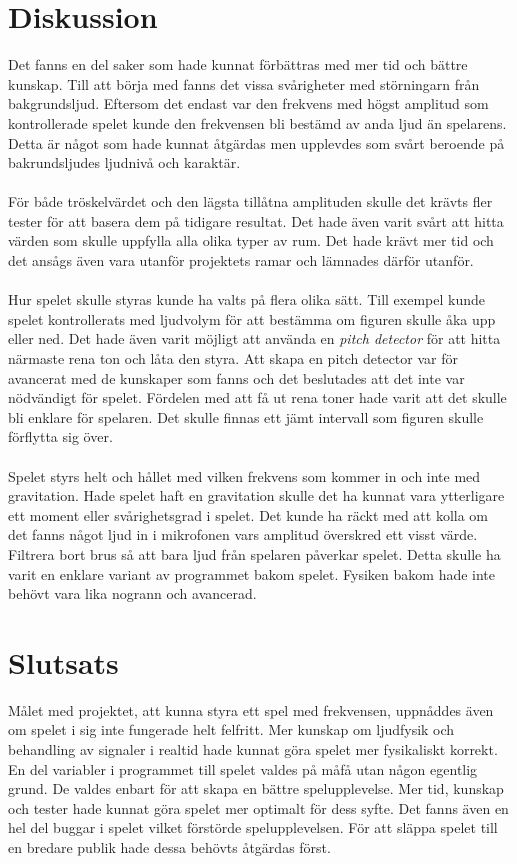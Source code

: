 \documentclass[12pt, titlepage, a4paper]{article}
\begin{document}
	\section{Diskussion}
		Det fanns en del saker som hade kunnat förbättras med mer tid och bättre kunskap. Till att börja med fanns det vissa svårigheter med störningarn från bakgrundsljud. Eftersom det endast var den frekvens med högst amplitud som kontrollerade spelet kunde den frekvensen bli bestämd av anda ljud än spelarens. Detta är något som hade kunnat åtgärdas men upplevdes som svårt beroende på bakrundsljudes ljudnivå och karaktär.
		\\ \\
		För både tröskelvärdet och den lägsta tillåtna amplituden skulle det krävts fler tester för att basera dem på tidigare resultat. Det hade även varit svårt att hitta värden som skulle uppfylla alla olika typer av rum. Det hade krävt mer tid och det ansågs även vara utanför projektets ramar och lämnades därför utanför.
		\\ \\
		Hur spelet skulle styras kunde ha valts på flera olika sätt. Till exempel kunde spelet kontrollerats med ljudvolym för att bestämma om figuren skulle åka upp eller ned. Det hade även varit möjligt att använda en \textit{pitch detector} för att hitta närmaste rena ton och låta den styra. Att skapa en pitch detector var för avancerat med de kunskaper som fanns och det beslutades att det inte var nödvändigt för spelet. Fördelen med att få ut rena toner hade varit att det skulle bli enklare för spelaren. Det skulle finnas ett jämt intervall som figuren skulle förflytta sig över.
		\\ \\
		Spelet styrs helt och hållet med vilken frekvens som kommer in och inte med gravitation. Hade spelet haft en gravitation skulle det ha kunnat vara ytterligare ett moment eller svårighetsgrad i spelet. Det kunde ha räckt med att kolla om det fanns något ljud in i mikrofonen vars amplitud överskred ett visst värde. Filtrera bort brus så att bara ljud från spelaren påverkar spelet. Detta skulle ha varit en enklare variant av programmet bakom spelet. Fysiken bakom hade inte behövt vara lika nogrann och avancerad.

	\section{Slutsats}
		Målet med projektet, att kunna styra ett spel med frekvensen, uppnåddes även om spelet i sig inte fungerade helt felfritt. Mer kunskap om ljudfysik och behandling av signaler i realtid hade kunnat göra spelet mer fysikaliskt korrekt. En del variabler i programmet till spelet valdes på måfå utan någon egentlig grund. De valdes enbart för att skapa en bättre spelupplevelse. Mer tid, kunskap och tester hade kunnat göra spelet mer optimalt för dess syfte. Det fanns även en hel del buggar i spelet vilket förstörde spelupplevelsen. För att släppa spelet till en bredare publik hade dessa behövts åtgärdas först.
\end{document}
